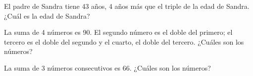 \documentclass[sin curso]{plantilla-evaluacion-v1}
\begin{document}
\begin{partes}
  \parte El padre de Sandra tiene 43 años, 4 años más que el triple de la edad de 
  Sandra. ¿Cuál es la edad de Sandra? 
  \begin{malla}[height=3cm]
  \end{malla}
  \begin{respuesta}[height=1.5cm]
  \end{respuesta}
  \parte La suma de 4 números es 90. El segundo número es el doble del primero; 
  el tercero es el doble del segundo y el cuarto, el doble del tercero. ¿Cuáles
  son los números?
  \begin{malla}[height=3cm]
  \end{malla}
  \begin{respuesta}[height=1.5cm]
  \end{respuesta}
  \parte La suma de 3 números consecutivos es 66. ¿Cuáles son los números?
  \begin{malla}[height=3cm]
  \end{malla}
  \begin{respuesta}[height=1.5cm]
  \end{respuesta}

\end{partes}
\end{document}
